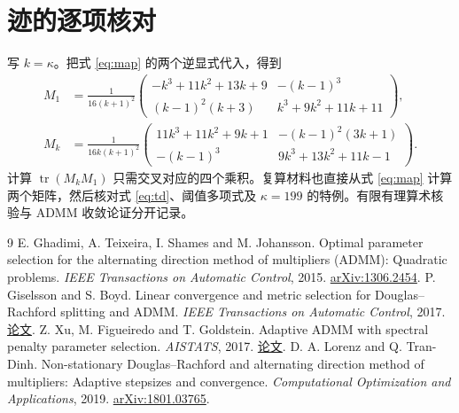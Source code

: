 \documentclass[UTF8,zihao=-4,fontset=windows]{ctexart}
\newcommand{\tr}{\operatorname{tr}}
\begin{document}
\section{迹的逐项核对}
写 $k=\kappa$。把式 \eqref{eq:map} 的两个逆显式代入，得到
\begin{align*}
 M_1 &=\frac{1}{16(k+1)^2}
 \begin{pmatrix}
 -k^3+11k^2+13k+9 & -(k-1)^3\\
 (k-1)^2(k+3) & k^3+9k^2+11k+11
 \end{pmatrix},\\[-1mm]
 M_k &=\frac{1}{16k(k+1)^2}
 \begin{pmatrix}
 11k^3+11k^2+9k+1 & -(k-1)^2(3k+1)\\
 -(k-1)^3 & 9k^3+13k^2+11k-1
 \end{pmatrix}.
\end{align*}
计算 $\tr(M_kM_1)$ 只需交叉对应的四个乘积。复算材料也直接从式 \eqref{eq:map} 计算两个矩阵，然后核对式 \eqref{eq:td}、阈值多项式及 $\kappa=199$ 的特例。有限有理算术核验与 ADMM 收敛论证分开记录。

\begingroup\small
\begin{thebibliography}{9}
 E. Ghadimi, A. Teixeira, I. Shames and M. Johansson. Optimal parameter selection for the alternating direction method of multipliers (ADMM): Quadratic problems. \textit{IEEE Transactions on Automatic Control}, 2015. \href{https://arxiv.org/abs/1306.2454}{arXiv:1306.2454}.
 P. Giselsson and S. Boyd. Linear convergence and metric selection for Douglas--Rachford splitting and ADMM. \textit{IEEE Transactions on Automatic Control}, 2017. \href{https://web.stanford.edu/~boyd/papers/pdf/metric_select_DR_ADMM.pdf}{论文}.
 Z. Xu, M. Figueiredo and T. Goldstein. Adaptive ADMM with spectral penalty parameter selection. \textit{AISTATS}, 2017. \href{https://proceedings.mlr.press/v54/xu17a.html}{论文}.
 D. A. Lorenz and Q. Tran-Dinh. Non-stationary Douglas--Rachford and alternating direction method of multipliers: Adaptive stepsizes and convergence. \textit{Computational Optimization and Applications}, 2019. \href{https://arxiv.org/abs/1801.03765}{arXiv:1801.03765}.
\end{thebibliography}
\endgroup
\end{document}
